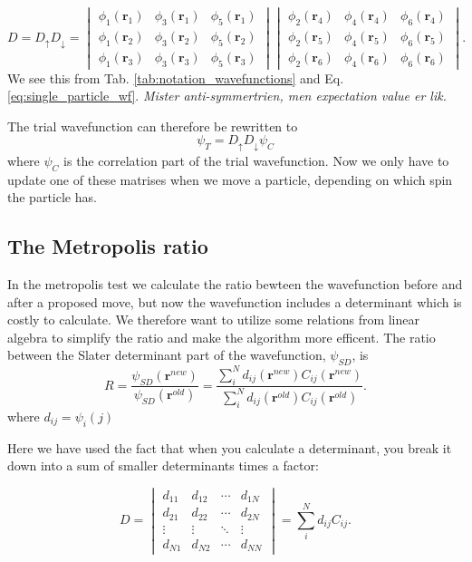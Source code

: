 $$ D = D_\uparrow D_\downarrow = \begin{vmatrix}
  \phi_{1}(\bm{r}_1) & \phi_{3}(\bm{r}_1) & \phi_{5}(\bm{r}_1) \\
  \phi_{1}(\bm{r}_2) & \phi_{3}(\bm{r}_2) &  \phi_{5}(\bm{r}_2) \\
  \phi_{1}(\bm{r}_3) & \phi_{3}(\bm{r}_3) & \phi_{5}(\bm{r}_3)
\end{vmatrix}\begin{vmatrix}
  \phi_{2}(\bm{r}_4) & \phi_{4}(\bm{r}_4) & \phi_{6}(\bm{r}_4) \\
  \phi_{2}(\bm{r}_5) & \phi_{4}(\bm{r}_5) &  \phi_{6}(\bm{r}_5) \\
  \phi_{2}(\bm{r}_6) & \phi_{4}(\bm{r}_6) & \phi_{6}(\bm{r}_6)
\end{vmatrix}.
$$
We see this from Tab. \ref{tab:notation_wavefunctions} and Eq. \ref{eq:single_particle_wf}.
\textit{Mister anti-symmertrien, men expectation value er lik. } 

The trial wavefunction can therefore be rewritten to 
$$ \psi_T = D_\uparrow D_\downarrow \psi_C $$ where $\psi_C$ is the correlation part of the trial wavefunction. Now we only have to update one of these matrises when we move a particle, depending on which spin the particle has. 
 
\subsection{The Metropolis ratio}\label{app:efficient_R}

In the metropolis test we calculate the ratio bewteen the wavefunction before and after a proposed move, but now the wavefunction includes a determinant which is costly to calculate. We therefore want to utilize some relations from linear algebra to simplify the ratio and make the algorithm more efficent. The ratio between the Slater determinant part of the wavefunction, $\psi_{SD}$, is
\begin{equation}\label{eq:metropolis_ratio}
R = \frac{\psi_{SD}(\bm{r}^{new})}{\psi_{SD}(\bm{r}^{old})} = \frac{\sum_i^N d_{ij}(\bm{r}^{new})C_{ij}(\bm{r}^{new})}{\sum_i^N d_{ij}(\bm{r}^{old})C_{ij}(\bm{r}^{old})}.
\end{equation} where $d_{ij} = \psi_i(j)$

Here we have used the fact that when you calculate a determinant, you break it down into a sum of smaller determinants times a factor:

\begin{equation*}
D = 
 \begin{vmatrix}
  d_{11} & d_{12} & \cdots & d_{1N} \\
  d_{21} & d_{22} & \cdots & d_{2N} \\
  \vdots  & \vdots  & \ddots & \vdots  \\
  d_{N1} & d_{N2} & \cdots & d_{NN} 
\end{vmatrix} = \sum_i^N d_{ij}C_{ij}. %
\end{equation*}

